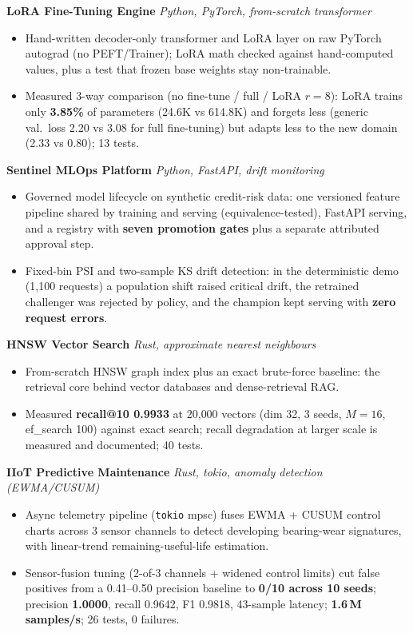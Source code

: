 \documentclass[10pt]{article}
\newcommand{\projectentry}[2]{%
  \noindent\textbf{#1} \hfill \textit{#2}\\[-0.3em]
}
\begin{document}
\projectentry{LoRA Fine-Tuning Engine}{Python, PyTorch, from-scratch transformer}
\begin{itemize}
  \item Hand-written decoder-only transformer and LoRA layer on raw PyTorch autograd (no PEFT/Trainer); LoRA math checked against hand-computed values, plus a test that frozen base weights stay non-trainable.
  \item Measured 3-way comparison (no fine-tune / full / LoRA $r{=}8$): LoRA trains only \textbf{3.85\%} of parameters (24.6K vs 614.8K) and forgets less (generic val.\ loss 2.20 vs 3.08 for full fine-tuning) but adapts less to the new domain (2.33 vs 0.80); 13 tests.
\end{itemize}

\projectentry{Sentinel MLOps Platform}{Python, FastAPI, drift monitoring}
\begin{itemize}
  \item Governed model lifecycle on synthetic credit-risk data: one versioned feature pipeline shared by training and serving (equivalence-tested), FastAPI serving, and a registry with \textbf{seven promotion gates} plus a separate attributed approval step.
  \item Fixed-bin PSI and two-sample KS drift detection: in the deterministic demo (1{,}100 requests) a population shift raised critical drift, the retrained challenger was rejected by policy, and the champion kept serving with \textbf{zero request errors}.
\end{itemize}

\projectentry{HNSW Vector Search}{Rust, approximate nearest neighbours}
\begin{itemize}
  \item From-scratch HNSW graph index plus an exact brute-force baseline: the retrieval core behind vector databases and dense-retrieval RAG.
  \item Measured \textbf{recall@10 0.9933} at 20{,}000 vectors (dim 32, 3 seeds, $M{=}16$, ef\_search 100) against exact search; recall degradation at larger scale is measured and documented; 40 tests.
\end{itemize}

\projectentry{IIoT Predictive Maintenance}{Rust, tokio, anomaly detection (EWMA/CUSUM)}
\begin{itemize}
  \item Async telemetry pipeline (\texttt{tokio} mpsc) fuses EWMA + CUSUM control charts across 3 sensor channels to detect developing bearing-wear signatures, with linear-trend remaining-useful-life estimation.
  \item Sensor-fusion tuning (2-of-3 channels + widened control limits) cut false positives from a 0.41--0.50 precision baseline to \textbf{0/10 across 10 seeds}; precision \textbf{1.0000}, recall 0.9642, F1 0.9818, 43-sample latency; \textbf{1.6\,M samples/s}; 26 tests, 0 failures.
\end{itemize}
\end{document}
